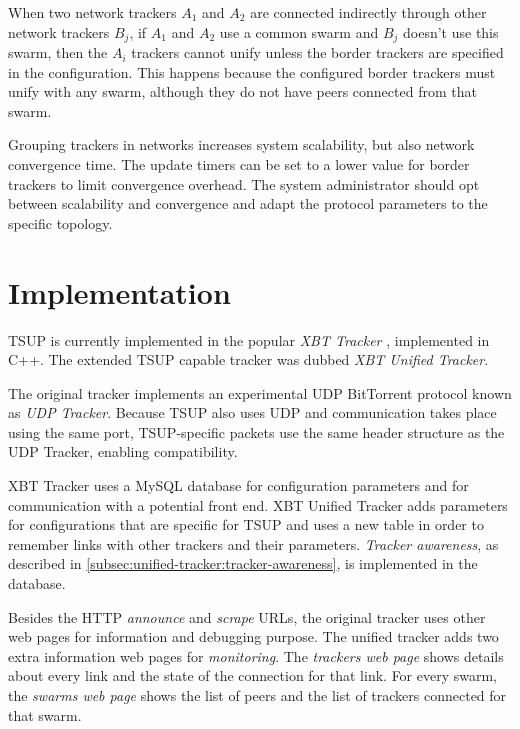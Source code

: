 When two network trackers $A_{1}$ and $A_{2}$ are connected indirectly through
other network trackers $B_{j}$, if $A_{1}$ and $A_{2}$ use a common swarm and
$B_{j}$ doesn't use this swarm, then the $A_{i}$ trackers cannot unify unless
the border trackers are specified in the configuration. This happens because
the configured border trackers must unify with any swarm, although they do not
have peers connected from that swarm.

Grouping trackers in networks increases system scalability, but also network
convergence time. The update timers can be set to a lower value for border
trackers to limit convergence overhead.  The system administrator should opt
between scalability and convergence and adapt the protocol parameters to the
specific topology.

\section{Implementation}
\label{sec:unified-tracker:implementation}

TSUP is currently implemented in the popular \textit{XBT Tracker}
\cite{xbt-tracker}, implemented in C++. The
extended TSUP capable tracker was dubbed \textit{XBT Unified Tracker}.

The original tracker implements an experimental UDP BitTorrent protocol
known as \textit{UDP Tracker}. Because TSUP also uses UDP and communication
takes place using the same port, TSUP-specific packets use the same header
structure as the UDP Tracker, enabling compatibility.

XBT Tracker uses a MySQL database \cite{xbt-table-doc} for configuration
parameters \cite{xbt-config} and for communication with a potential
front end. XBT Unified Tracker adds parameters for
configurations that are specific for TSUP and uses a new table
in order to remember links with other trackers and their parameters.
\textit{Tracker awareness}, as described in
\ref{subsec:unified-tracker:tracker-awareness}, is implemented in the
database.

Besides the HTTP \textit{announce} and \textit{scrape} URLs, the original
tracker uses other web pages for information and debugging purpose. The
unified tracker adds two extra information web pages for \textit{monitoring}.
The \textit{trackers web page} shows details about every link and the state of
the connection for that link. For every swarm, the \textit{swarms web page}
shows the list of peers and the list of trackers connected for that swarm.

